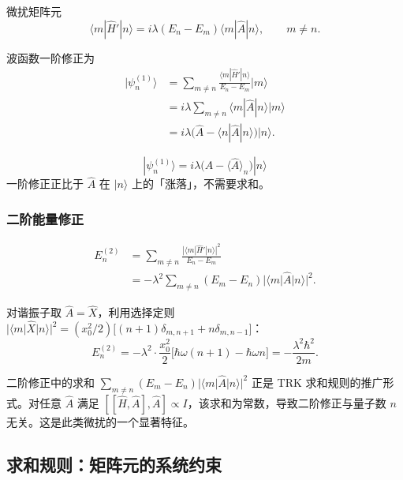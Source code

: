 微扰矩阵元
\[
\langle m|\hat{H}'|n\rangle = i\lambda(E_n - E_m)\langle m|\hat{A}|n\rangle,
\qquad m\neq n.
\]

波函数一阶修正为
\begin{align*}
|\psi_n^{(1)}\rangle
&= \sum_{m\neq n}\frac{\langle m|\hat{H}'|n\rangle}{E_n - E_m}|m\rangle \\
&= i\lambda\sum_{m\neq n}\langle m|\hat{A}|n\rangle|m\rangle \\
&= i\lambda\bigl(\hat{A} - \langle n|\hat{A}|n\rangle\bigr)|n\rangle.
\end{align*}

\begin{formulabox}[简洁结果]
\[
\boxed{|\psi_n^{(1)}\rangle = i\lambda\bigl(\hat{A} - \langle\hat{A}\rangle_n\bigr)|n\rangle}
\]
一阶修正正比于 $\hat{A}$ 在 $|n\rangle$ 上的「涨落」，不需要求和。
\end{formulabox}

\subsubsection{二阶能量修正}

\begin{align*}
E_n^{(2)}
&= \sum_{m\neq n}\frac{|\langle m|\hat{H}'|n\rangle|^2}{E_n - E_m} \\
&= -\lambda^2\sum_{m\neq n}(E_m - E_n)|\langle m|\hat{A}|n\rangle|^2.
\end{align*}

对谐振子取 $\hat{A}=\hat{X}$，利用选择定则 $|\langle m|\hat{X}|n\rangle|^2 = (x_0^2/2)\bigl[(n+1)\delta_{m,n+1} + n\delta_{m,n-1}\bigr]$：
\[
E_n^{(2)} = -\lambda^2\cdot\frac{x_0^2}{2}\bigl[\hbar\omega(n+1) - \hbar\omega n\bigr]
= -\frac{\lambda^2\hbar^2}{2m}.
\]

\begin{insightbox}
二阶修正中的求和 $\sum_{m\neq n}(E_m-E_n)|\langle m|\hat{A}|n\rangle|^2$ 正是 TRK 求和规则的推广形式。对任意 $\hat{A}$ 满足 $[[\hat{H},\hat{A}],\hat{A}]\propto I$，该求和为常数，导致二阶修正与量子数 $n$ 无关。这是此类微扰的一个显著特征。
\end{insightbox}

\subsection{求和规则：矩阵元的系统约束}

